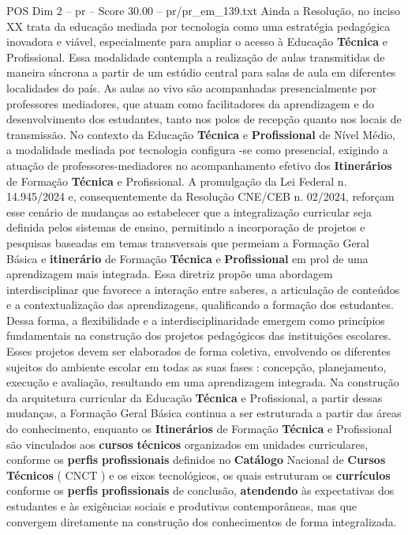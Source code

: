 \begin{textsample}{POS Dim 2 – pr – Score 30.00 – pr/pr\_em\_139.txt}
Ainda a Resolução, no inciso XX trata da educação mediada por tecnologia como uma estratégia pedagógica inovadora e viável, especialmente para ampliar o acesso à Educação \textbf{Técnica} e Profissional.
Essa modalidade contempla a realização de aulas transmitidas de maneira síncrona a partir de um estúdio central para salas de aula em diferentes localidades do país.
As aulas ao vivo são acompanhadas presencialmente por professores mediadores, que atuam como facilitadores da aprendizagem e do desenvolvimento dos estudantes, tanto nos polos de recepção quanto nos locais de transmissão.
No contexto da Educação \textbf{Técnica} e \textbf{Profissional} de Nível Médio, a modalidade mediada por tecnologia configura -se como presencial, exigindo a atuação de professores-mediadores no acompanhamento efetivo dos \textbf{Itinerários} de Formação \textbf{Técnica} e Profissional.
A promulgação da Lei Federal n. 14.945/2024 e, consequentemente da Resolução CNE/CEB n. 02/2024, reforçam esse cenário de mudanças ao estabelecer que a integralização curricular seja definida pelos sistemas de ensino, permitindo a incorporação de projetos e pesquisas baseadas em temas transversais que permeiam a Formação Geral Básica e \textbf{itinerário} de Formação \textbf{Técnica} e \textbf{Profissional} em prol de uma aprendizagem mais integrada.
Essa diretriz propõe uma abordagem interdisciplinar que favorece a interação entre saberes, a articulação de conteúdos e a contextualização das aprendizagens, qualificando a formação dos estudantes.
Dessa forma, a flexibilidade e a interdisciplinaridade emergem como princípios fundamentais na construção dos projetos pedagógicos das instituições escolares.
Esses projetos devem ser elaborados de forma coletiva, envolvendo os diferentes sujeitos do ambiente escolar em todas as suas fases : concepção, planejamento, execução e avaliação, resultando em uma aprendizagem integrada.
Na construção da arquitetura curricular da Educação \textbf{Técnica} e Profissional, a partir dessas mudanças, a Formação Geral Básica continua a ser estruturada a partir das áreas do conhecimento, enquanto os \textbf{Itinerários} de Formação \textbf{Técnica} e Profissional são vinculados aos \textbf{cursos} \textbf{técnicos} organizados em unidades curriculares, conforme os \textbf{perfis} \textbf{profissionais} definidos no \textbf{Catálogo} Nacional de \textbf{Cursos} \textbf{Técnicos} ( CNCT ) e os eixos tecnológicos, os quais estruturam os \textbf{currículos} conforme os \textbf{perfis} \textbf{profissionais} de conclusão, \textbf{atendendo} às expectativas dos estudantes e às exigências sociais e produtivas contemporâneas, mas que convergem diretamente na construção dos conhecimentos de forma integralizada.

\end{textsample}
